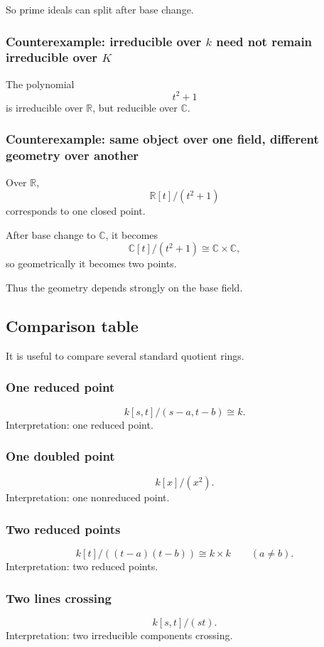 \documentclass[12pt,a4paper]{article}
\theoremstyle{notespace}
\theoremstyle{definition}
\begin{document}
So prime ideals can split after base change.

\subsubsection{Counterexample: irreducible over \(k\) need not remain irreducible over \(K\)}

The polynomial
\[
t^2+1
\]
is irreducible over \(\mathbb R\), but reducible over \(\mathbb C\).

\subsubsection{Counterexample: same object over one field, different geometry over another}

Over \(\mathbb R\),
\[
\mathbb R[t]/(t^2+1)
\]
corresponds to one closed point.

After base change to \(\mathbb C\), it becomes
\[
\mathbb C[t]/(t^2+1)\cong \mathbb C\times \mathbb C,
\]
so geometrically it becomes two points.

Thus the geometry depends strongly on the base field.

\subsection{Comparison table}

It is useful to compare several standard quotient rings.

\subsubsection{One reduced point}
\[
k[s,t]/(s-a,t-b)\cong k.
\]
Interpretation: one reduced point.

\subsubsection{One doubled point}
\[
k[x]/(x^2).
\]
Interpretation: one nonreduced point.

\subsubsection{Two reduced points}
\[
k[t]/((t-a)(t-b))\cong k\times k
\qquad (a\neq b).
\]
Interpretation: two reduced points.

\subsubsection{Two lines crossing}
\[
k[s,t]/(st).
\]
Interpretation: two irreducible components crossing.
\end{document}
